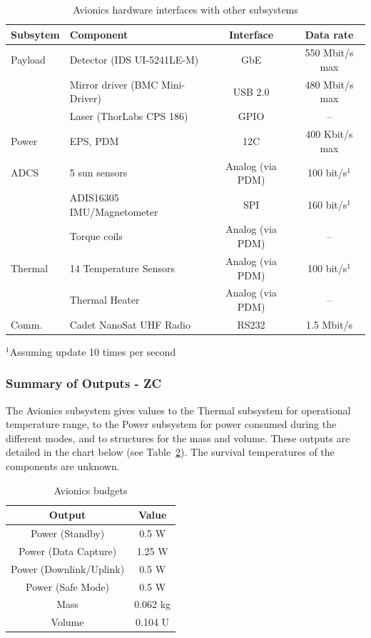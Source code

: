 \documentclass[12pt]{article}
\begin{document}
\begin{table}[ht]
\caption{Avionics hardware interfaces with other subsystems}
\label{table:avionics_interfaces}
\begin{center}
    \begin{tabular}{| p{2cm} | l | c | c |} \hline
    	\textbf{Subsytem} & \textbf{Component} & \textbf{Interface} & \textbf{Data rate} \\ \hline \hline
    Payload & Detector (IDS UI-5241LE-M) & GbE & 550 Mbit/s max  \\
     & Mirror driver (BMC Mini-Driver) & USB 2.0 & 480 Mbit/s max \\
     & Laser (ThorLabs CPS 186) & GPIO & -- \\ \hline
    Power & EPS, PDM & 12C & 400 Kbit/s max \\ \hline
    ADCS & 5 sun sensors & Analog (via PDM) & 100 bit/s$^1$ \\
     & ADIS16305 IMU/Magnetometer & SPI & 160 bit/s$^1$ \\
     & Torque coils & Analog (via PDM) & -- \\ \hline
    Thermal & 14 Temperature Sensors & Analog (via PDM) & 100 bit/s$^1$ \\
     & Thermal Heater & Analog (via PDM) & -- \\ \hline
    Comm. & Cadet NanoSat UHF Radio & RS232 & 1.5 Mbit/s \\ \hline 
    \end{tabular}
$^1$Assuming update 10 times per second
\end{center}
\end{table}


			\subsubsection{Summary of Outputs - ZC}

The Avionics subsystem gives values to the Thermal subsystem for operational temperature range, to the Power subsystem for power consumed during the different modes, and to structures for the mass and volume. These outputs are detailed in the chart below (see Table~\ref{table:avionics_summary_outputs}). The survival temperatures of the components are unknown.


\begin{table}[ht]
\caption{Avionics budgets}
\label{table:avionics_summary_outputs}
\begin{center}
    \begin{tabular}{|c||c|} \hline
    	\textbf{Output} & \textbf{Value} \\ \hline \hline
    Power (Standby) & 0.5 W  \\
    Power (Data Capture) & 1.25 W \\
    Power (Downlink/Uplink) & 0.5 W \\
    Power (Safe Mode) & 0.5 W \\
    Mass & 0.062 kg  \\
    Volume & 0.104 U \\ \hline 
    \end{tabular}
\end{center}
\end{table}
\end{document}

